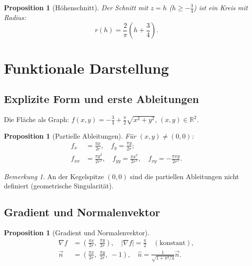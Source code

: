 \documentclass[12pt,a4paper]{article}
\theoremstyle{plain}
\newtheorem{proposition}[satz]{Proposition}
\theoremstyle{definition}
\theoremstyle{remark}
\newtheorem{bemerkung}{Bemerkung}[section]
\newcommand{\R}{\mathbb{R}}
\newcommand{\vek}[1]{\vec{#1}}
\begin{document}
\begin{proposition}[H\"{o}henschnitt]\label{prop:hoehenschnitt}
Der Schnitt mit $z=h$ ($h\geq -\tfrac{3}{4}$) ist ein Kreis mit Radius:
\begin{equation}\label{eq:radials}
r(h) = \frac{2}{\pi}\!\left(h+\frac{3}{4}\right).
\end{equation}
\end{proposition}

\section{Funktionale Darstellung}

\subsection{Explizite Form und erste Ableitungen}

Die Fl\"{a}che als Graph: $f(x,y) = -\tfrac{3}{4}+\tfrac{\pi}{2}\sqrt{x^2+y^2}$,
$(x,y)\in\R^2$.

\begin{proposition}[Partielle Ableitungen]\label{prop:partial}
F\"{u}r $(x,y)\neq(0,0)$:
\begin{align}
f_x &= \frac{\pi x}{2r},\quad
f_y = \frac{\pi y}{2r};\label{eq:grad1}\\
f_{xx} &= \frac{\pi y^2}{2r^3},\quad
f_{yy} = \frac{\pi x^2}{2r^3},\quad
f_{xy} = -\frac{\pi xy}{2r^3}.\label{eq:grad2}
\end{align}
\end{proposition}

\begin{bemerkung}
An der Kegelspitze $(0,0)$ sind die partiellen Ableitungen nicht definiert
(geometrische Singularit\"{a}t).
\end{bemerkung}

\subsection{Gradient und Normalenvektor}

\begin{proposition}[Gradient und Normalenvektor]\label{prop:gradient}
\begin{align*}
\nabla f &= \left(\frac{\pi x}{2r},\;\frac{\pi y}{2r}\right),\quad
|\nabla f| = \frac{\pi}{2}\quad(\text{konstant}),\\
\vek{n} &= \left(\frac{\pi x}{2r},\;\frac{\pi y}{2r},\;-1\right),\quad
\hat{n} = \frac{1}{\sqrt{1+\pi^2/4}}\vek{n}.
\end{align*}
\end{proposition}
\end{document}
